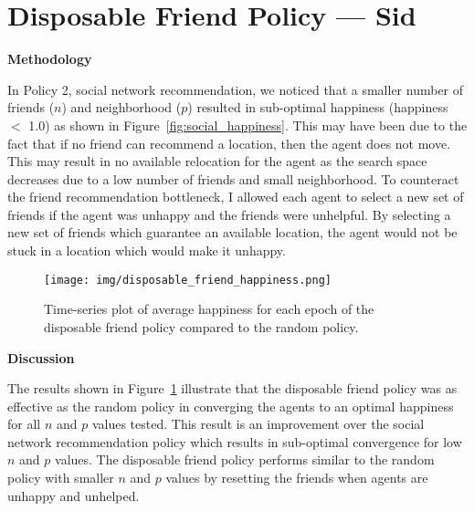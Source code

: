 \documentclass[12pt, titlepage]{article}
\newcommand{\figref}[1]{Figure~\ref{#1}}
\begin{document}
	\section{Disposable Friend Policy --- Sid}
	\vspace{-12pt}
	\par \textbf{Methodology}
	\par In Policy 2, social network recommendation, we noticed that a smaller
	number of friends ($n$) and neighborhood ($p$) resulted in sub-optimal
	happiness (happiness $<$ 1.0) as shown in \figref{fig:social_happiness}.
	This may have been due to the fact that if no friend can recommend a location,
	then the agent does not move.
	This may result in no available relocation for the agent as the search space
	decreases due to a low number of friends and small neighborhood.
	To counteract the friend recommendation bottleneck, I allowed each agent to
	select a new set of friends if the agent was unhappy and the friends were
	unhelpful.
	By selecting a new set of friends which guarantee an available location, the
	agent would not be stuck in a location which would make it unhappy.
	\vspace{-12pt}
	\begin{figure}[htb]
		\centering
		\texttt{[image: img/disposable\_friend\_happiness.png]}
		\vspace{-12pt}
		\caption{Time-series plot of average happiness for each epoch of the
			disposable friend policy compared to the random policy.}%
		\label{fig:disposable_friend_happiness}
	\end{figure}
	\vspace{-12pt}
	\par \textbf{Discussion}
	\par The results shown in \figref{fig:disposable_friend_happiness} illustrate
	that the disposable friend policy was as effective as the random policy in
	converging the agents to an optimal happiness for all $n$ and $p$ values
	tested.
	This result is an improvement over the social network recommendation policy
	which results in sub-optimal convergence for low $n$ and $p$ values.
	The disposable friend policy performs similar to the random policy with
	smaller $n$ and $p$ values by resetting the friends when agents are unhappy
	and unhelped.
	\newpage
\end{document}
